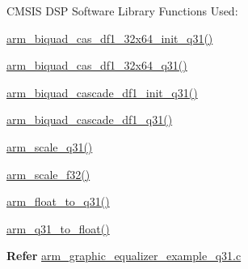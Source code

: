 \begin{DoxyParagraph}{C\-M\-S\-I\-S D\-S\-P Software Library Functions Used\-:}

\end{DoxyParagraph}
\begin{DoxyParagraph}{}

\begin{DoxyItemize}
\item \hyperlink{group___biquad_cascade_d_f1__32x64_ga44900cecb8083afcaabf905ffcd656bb}{arm\-\_\-biquad\-\_\-cas\-\_\-df1\-\_\-32x64\-\_\-init\-\_\-q31()}
\item \hyperlink{group___biquad_cascade_d_f1__32x64_ga953a83e69685de6575cff37feb358a93}{arm\-\_\-biquad\-\_\-cas\-\_\-df1\-\_\-32x64\-\_\-q31()}
\item \hyperlink{group___biquad_cascade_d_f1_gaf42a44f9b16d61e636418c83eefe577b}{arm\-\_\-biquad\-\_\-cascade\-\_\-df1\-\_\-init\-\_\-q31()}
\item \hyperlink{group___biquad_cascade_d_f1_ga27b0c54da702713976e5202d20b4473f}{arm\-\_\-biquad\-\_\-cascade\-\_\-df1\-\_\-q31()}
\item \hyperlink{group__scale_ga83e36cd82bf51ce35406a199e477d47c}{arm\-\_\-scale\-\_\-q31()}
\item \hyperlink{group__scale_ga3487af88b112f682ee90589cd419e123}{arm\-\_\-scale\-\_\-f32()}
\item \hyperlink{group__float__to__x_ga177704107f94564e9abe4daaa36f4554}{arm\-\_\-float\-\_\-to\-\_\-q31()}
\item \hyperlink{group__q31__to__x_gacf407b007a37da18e99dabd9023c56b4}{arm\-\_\-q31\-\_\-to\-\_\-float()}
\end{DoxyItemize}
\end{DoxyParagraph}
{\bfseries  Refer } \hyperlink{arm_graphic_equalizer_example_q31_8c-example}{arm\-\_\-graphic\-\_\-equalizer\-\_\-example\-\_\-q31.\-c} 